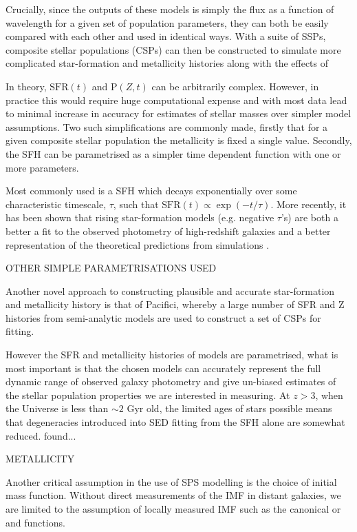 Crucially, since the outputs of these models is simply the flux as a function of wavelength for a given set of population parameters, they can both be easily compared with each other and used in identical ways. With a suite of SSPs, composite stellar populations (CSPs) can then be constructed to simulate more complicated star-formation and metallicity histories along with the effects of 

In theory, $\text{SFR}(t)$ and $\text{P}(Z,t)$ can be arbitrarily complex. However, in practice this would require huge computational expense and with most data lead to minimal increase in accuracy for estimates of stellar masses over simpler model assumptions. Two such simplifications are commonly made, firstly that for a given composite stellar population the metallicity is fixed a single value. Secondly, the SFH can be parametrised as a simpler time dependent function with one or more parameters.

Most commonly used is a SFH which decays exponentially over some characteristic timescale, $\tau$, such that $\text{SFR}(t) \propto \exp(-t/\tau)$. More recently, it has been shown that rising star-formation models (e.g. negative $\tau$'s) are both a better a fit to the observed photometry of high-redshift galaxies \citep{Maraston:2010dl} and a better representation of the theoretical predictions from simulations \citep{2011MNRAS.410.1703F,Dayal:2013jm}.

OTHER SIMPLE PARAMETRISATIONS USED

Another novel approach to constructing plausible and accurate star-formation and metallicity history is that of Pacifici, whereby a large number of SFR and Z histories from semi-analytic models are used to construct a set of CSPs for fitting.

However the SFR and metallicity histories of models are parametrised, what is most important is that the chosen models can accurately represent the full dynamic range of observed galaxy photometry and give un-biased estimates of the stellar population properties we are interested in measuring. At $z > 3$, when the Universe is less than $\sim 2$ Gyr old, the limited ages of stars possible means that degeneracies introduced into SED fitting from the SFH alone are somewhat reduced. \citep{2013A&A...549A...4S} found...

METALLICITY

Another critical assumption in the use of SPS modelling is the choice of initial mass function. Without direct measurements of the IMF in distant galaxies, we are limited to the assumption of locally measured IMF such as the canonical \citet{Salpeter:1955hz} or \citet{Chabrier:2003ki} and \citet{Kroupa:2001ki} functions. 

